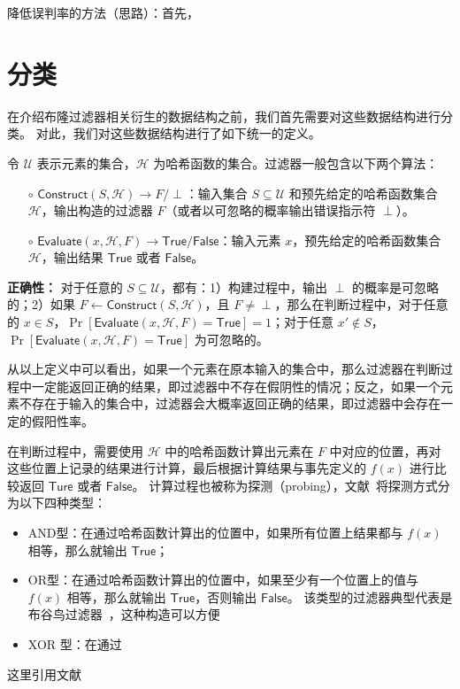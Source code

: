 降低误判率的方法（思路）：首先，

\section{分类}

在介绍布隆过滤器相关衍生的数据结构之前，我们首先需要对这些数据结构进行分类。
对此，我们对这些数据结构进行了如下统一的定义。

\begin{definition}
    令 $\mathcal{U}$ 表示元素的集合，$\mathcal{H}$ 为哈希函数的集合。过滤器一般包含以下两个算法：
    \begin{itemize}
    \item[$\circ$] $\mathsf{Construct}(S, \mathcal{H}) \to F/\perp$：输入集合 $S \subseteq \mathcal{U}$ 和预先给定的哈希函数集合 $\mathcal{H}$，输出构造的过滤器 $F$（或者以可忽略的概率输出错误指示符 $\perp$）。
    \item[$\circ$] $\mathsf{Evaluate}(x, \mathcal{H}, F) \to \mathsf{True} / \mathsf{False} $：输入元素 $x$，预先给定的哈希函数集合 $\mathcal{H}$，输出结果 $\mathsf{True}$ 或者 $\mathsf{False}$。
    \end{itemize}
\end{definition}

\textbf{正确性：} 对于任意的 $S \subseteq \mathcal{U}$，都有：1）构建过程中，输出 $\perp$ 的概率是可忽略的；2）如果 $F \gets \mathsf{Construct}(S, \mathcal{H})$，且 $F \neq \perp$，那么在判断过程中，对于任意的 $x \in S$，$\Pr[\mathsf{Evaluate}(x, \mathcal{H}, F) = \mathsf{True}] = 1$；对于任意 $x' \notin S$，$\Pr[\mathsf{Evaluate}(x, \mathcal{H}, F) = \mathsf{True}]$ 为可忽略的。

从以上定义中可以看出，如果一个元素在原本输入的集合中，那么过滤器在判断过程中一定能返回正确的结果，即过滤器中不存在假阴性的情况；反之，如果一个元素不存在于输入的集合中，过滤器会大概率返回正确的结果，即过滤器中会存在一定的假阳性率。

在判断过程中，需要使用 $\mathcal{H}$ 中的哈希函数计算出元素在 $F$ 中对应的位置，再对这些位置上记录的结果进行计算，最后根据计算结果与事先定义的 $f(x)$ 进行比较返回 $\mathsf{Ture}$ 或者 $\mathsf{False}$。
计算过程也被称为探测（probing），文献~\cite{dillinger2021ribbon}将探测方式分为以下四种类型：

\begin{itemize}
    \item AND型：在通过哈希函数计算出的位置中，如果所有位置上结果都与 $f(x)$ 相等，那么就输出 $\mathsf{True}$；
    \item OR型：在通过哈希函数计算出的位置中，如果至少有一个位置上的值与 $f(x)$ 相等，那么就输出 $\mathsf{True}$，否则输出 $\mathsf{False}$。
    该类型的过滤器典型代表是布谷鸟过滤器~\cite{fan2014cuckoo}，这种构造可以方便
    \item XOR 型：在通过
\end{itemize}


这里引用文献~\cite{2024YinSiJiHeYunSuanZhongDeGuanJianShuJuJieGouYanJiu}
